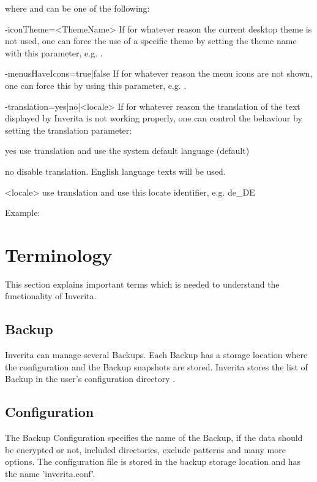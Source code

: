 where  and  can be one of the following:
\begin{attributes}
 \item[-iconTheme=<ThemeName>]
    If for whatever reason the current desktop theme is not used, one can force the
    use of a specific theme by setting the theme name with this parameter, e.g.
    .

  \item[-menusHaveIcons=true|false]
    If for whatever reason the menu icons are not shown, one can force this by using
    this parameter, e.g. .

  \item[-translation=yes|no|<locale>]
    If for whatever reason the translation of the text displayed by Inverita is not
    working properly, one can control the behaviour by setting the translation
    parameter:
    \begin{attributes}[50pt]
       \item[yes]    use translation and use the system default language (default)
       \item[no]     disable translation. English language texts will be used.
       \item[<locale>] use translation and use this locate identifier, e.g. de\_DE
    \end{attributes}
    Example: 
\end{attributes}


\section{Terminology}

This section explains important terms which is needed to understand
the functionality of Inverita.

\subsection{Backup}
Inverita can manage several Backups. Each Backup has
a storage location where the configuration and the
Backup snapshots are stored.
Inverita stores the list of Backup in the user's
configuration directory .

\label{test1}

\subsection{Configuration}
The Backup Configuration specifies the name of the Backup,
if the data should be encrypted or not, included
directories, exclude patterns and many more options.
The configuration file is stored in the backup storage
location and has the name 'inverita.conf'.

